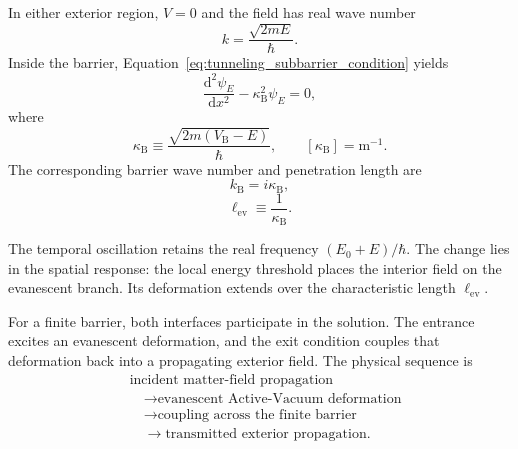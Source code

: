 In either exterior region, $V=0$ and the field has real wave number
\begin{equation}
    \boxed{k=\frac{\sqrt{2mE}}{\hbar}}.
    \label{eq:tunneling_exterior_wavenumber}
\end{equation}
Inside the barrier, Equation~\eqref{eq:tunneling_subbarrier_condition} yields
\begin{equation}
    \frac{\mathrm d^2\psi_E}{\mathrm dx^2}
    -\kappa_{\mathrm B}^2\psi_E=0,
    \label{eq:tunneling_barrier_wave_equation}
\end{equation}
where
\begin{equation}
    \boxed{
    \kappa_{\mathrm B}
    \equiv\frac{\sqrt{2m(V_{\mathrm B}-E)}}{\hbar}
    },
    \qquad [\kappa_{\mathrm B}]=\mathrm m^{-1}.
    \label{eq:tunneling_barrier_evanescence}
\end{equation}
The corresponding barrier wave number and penetration length are
\begin{equation}
    k_{\mathrm B}=i\kappa_{\mathrm B},
    \label{eq:tunneling_imaginary_wavenumber}
\end{equation}
\begin{equation}
    \ell_{\mathrm{ev}}\equiv\frac{1}{\kappa_{\mathrm B}}.
    \label{eq:tunneling_penetration_length}
\end{equation}

The temporal oscillation retains the real frequency $(E_0+E)/\hbar$. The change lies in the spatial response: the local energy threshold places the interior field on the evanescent branch. Its deformation extends over the characteristic length $\ell_{\mathrm{ev}}$.

For a finite barrier, both interfaces participate in the solution. The entrance excites an evanescent deformation, and the exit condition couples that deformation back into a propagating exterior field. The physical sequence is
\begin{equation}
    \begin{aligned}
    &\text{incident matter-field propagation}\\
    &\quad\longrightarrow\text{evanescent Active-Vacuum deformation}\\
    &\quad\longrightarrow\text{coupling across the finite barrier}\\
    &\quad\longrightarrow\text{transmitted exterior propagation}.
    \end{aligned}
    \label{eq:tunneling_mechanical_sequence}
\end{equation}

